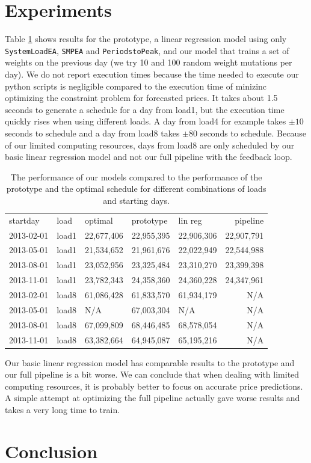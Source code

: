 \documentclass{article}
\begin{document}
\section{Experiments}
Table \ref{tab:results} shows results for the prototype, a linear regression model using only \verb|SystemLoadEA|, \verb|SMPEA| and \verb|PeriodstoPeak|, and our model that trains a set of weights on the previous day (we try 10 and 100 random weight mutations per day). We do not report execution times because the time needed to execute our python scripts is negligible compared to the execution time of minizinc optimizing the constraint problem for forecasted prices. It takes about 1.5 seconds to generate a schedule for a day from load1, but the execution time quickly rises when using different loads. A day from load4 for example takes $\pm 10$ seconds to schedule and a day from load8 takes $\pm 80$ seconds to schedule. Because of our limited computing resources, days from load8 are only scheduled by our basic linear regression model and not our full pipeline with the feedback loop.

\begin{table}
	\begin{tabular}{lllllr}
		startday & load &optimal & prototype & lin reg & pipeline\\
		2013-02-01 & load1 & 22,677,406& 22,955,395 & 22,906,306 & 22,907,791\\
		2013-05-01 & load1 & 21,534,652& 21,961,676 & 22,022,949 & 22,544,988\\
		2013-08-01 & load1 & 23,052,956& 23,325,484 & 23,310,270 & 23,399,398\\
		2013-11-01 & load1 & 23,782,343& 24,358,360 & 24,360,228 & 24,347,961\\
		2013-02-01 & load8 & 61,086,428& 61,833,570 & 61,934,179 & N/A\\
		2013-05-01 & load8 & N/A& 67,003,304 & N/A & N/A\\
		2013-08-01 & load8 & 67,099,809& 68,446,485 & 68,578,054 & N/A\\
		2013-11-01 & load8 & 63,382,664& 64,945,087 & 65,195,216 & N/A\\
	\end{tabular}
	\caption{The performance of our models compared to the performance of the prototype and the optimal schedule for different combinations of loads and starting days.}
	\label{tab:results}
\end{table}
Our basic linear regression model has comparable results to the prototype and our full pipeline is a bit worse. We can conclude that when dealing with limited computing resources, it is probably better to focus on accurate price predictions. A simple attempt at optimizing the full pipeline actually gave worse results and takes a very long time to train. 
\section{Conclusion}
\end{document}
